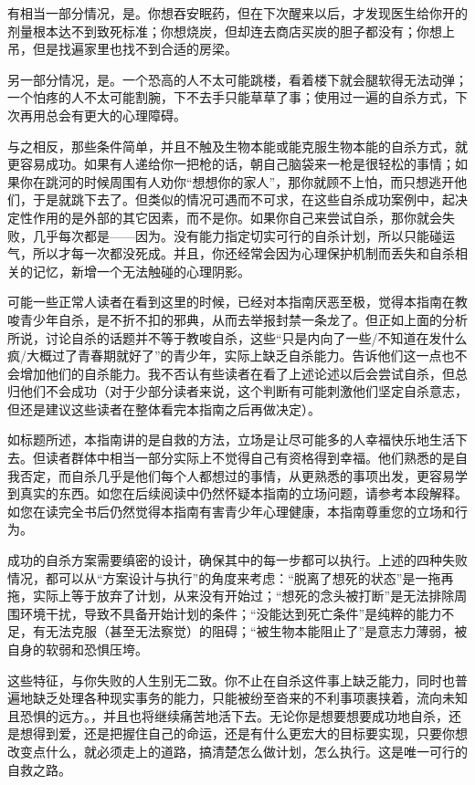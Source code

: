 有相当一部分情况，是。你想吞安眠药，但在下次醒来以后，才发现医生给你开的剂量根本达不到致死标准；你想烧炭，但却连去商店买炭的胆子都没有；你想上吊，但是找遍家里也找不到合适的房梁。

另一部分情况，是。一个恐高的人不太可能跳楼，看着楼下就会腿软得无法动弹；一个怕疼的人不太可能割腕，下不去手只能草草了事；使用过一遍的自杀方式，下次再用总会有更大的心理障碍。

与之相反，那些条件简单，并且不触及生物本能或能克服生物本能的自杀方式，就更容易成功。如果有人递给你一把枪的话，朝自己脑袋来一枪是很轻松的事情；如果你在跳河的时候周围有人劝你“想想你的家人”，那你就顾不上怕，而只想逃开他们，于是就跳下去了。但类似的情况可遇而不可求，在这些自杀成功案例中，起决定性作用的是外部的其它因素，而不是你。如果你自己来尝试自杀，那你就会失败，几乎每次都是——因为。没有能力指定切实可行的自杀计划，所以只能碰运气，所以才每一次都没死成。并且，你还经常会因为心理保护机制而丢失和自杀相关的记忆，新增一个无法触碰的心理阴影。

\begin{toparent}
可能一些正常人读者在看到这里的时候，已经对本指南厌恶至极，觉得本指南在教唆青少年自杀，是不折不扣的邪典，从而去举报封禁一条龙了。但正如上面的分析所说，讨论自杀的话题并不等于教唆自杀，这些“只是内向了一些/不知道在发什么疯/大概过了青春期就好了”的青少年，实际上缺乏自杀能力。告诉他们这一点也不会增加他们的自杀能力。我不否认有些读者在看了上述论述以后会尝试自杀，但总归他们不会成功（对于少部分读者来说，这个判断有可能刺激他们坚定自杀意志，但还是建议这些读者在整体看完本指南之后再做决定）。

如标题所述，本指南讲的是自救的方法，立场是让尽可能多的人幸福快乐地生活下去。但读者群体中相当一部分实际上不觉得自己有资格得到幸福。他们熟悉的是自我否定，而自杀几乎是他们每个人都想过的事情，从更熟悉的事项出发，更容易学到真实的东西。如您在后续阅读中仍然怀疑本指南的立场问题，请参考本段解释。如您在读完全书后仍然觉得本指南有害青少年心理健康，本指南尊重您的立场和行为。
\end{toparent}
成功的自杀方案需要缜密的设计，确保其中的每一步都可以执行。上述的四种失败情况，都可以从“方案设计与执行”的角度来考虑：“脱离了想死的状态”是一拖再拖，实际上等于放弃了计划，从来没有开始过；“想死的念头被打断”是无法排除周围环境干扰，导致不具备开始计划的条件；“没能达到死亡条件”是纯粹的能力不足，有无法克服（甚至无法察觉）的阻碍；“被生物本能阻止了”是意志力薄弱，被自身的软弱和恐惧压垮。

这些特征，与你失败的人生别无二致。你不止在自杀这件事上缺乏能力，同时也普遍地缺乏处理各种现实事务的能力，只能被纷至沓来的不利事项裹挟着，流向未知且恐惧的远方。，并且也将继续痛苦地活下去。无论你是想要想要成功地自杀，还是想得到爱，还是把握住自己的命运，还是有什么更宏大的目标要实现，只要你想改变点什么，就必须走上的道路，搞清楚怎么做计划，怎么执行。这是唯一可行的自救之路。